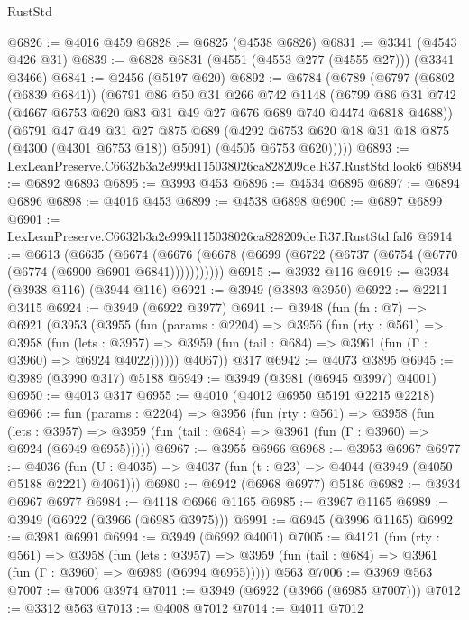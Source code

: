 \begin{lexlean}{RustStd}
\begin{coremodule}
@6826 := @4016 @459
@6828 := @6825 (@4538 @6826)
@6831 := @3341 (@4543 @426 @31)
@6839 := @6828 @6831 (@4551 (@4553 @277 (@4555 @27))) (@3341 @3466)
@6841 := @2456 (@5197 @620)
@6892 := @6784
    (@6789
      (@6797
        (@6802 (@6839 @6841))
        (@6791
          @86
          @50
          @31
          @266
          @742
          @1148
          (@6799 @86 @31 @742 (@4667 @6753 @620 @83 @31 @49 @27 @676 @689 @740 @4474 @6818 @4688))
          (@6791
            @47
            @49
            @31
            @27
            @875
            @689
            (@4292 @6753 @620 @18 @31 @18 @875 (@4300 (@4301 @6753 @18)) @5091)
            (@4505 @6753 @620)))))
@6893 := LexLeanPreserve.C6632b3a2e999d115038026ca828209de.R37.RustStd.look6
@6894 := @6892 @6893
@6895 := @3993 @453
@6896 := @4534 @6895
@6897 := @6894 @6896
@6898 := @4016 @453
@6899 := @4538 @6898
@6900 := @6897 @6899
@6901 := LexLeanPreserve.C6632b3a2e999d115038026ca828209de.R37.RustStd.fal6
@6914 := @6613
    (@6635
      (@6674 (@6676 (@6678 (@6699 (@6722 (@6737 (@6754 (@6770 (@6774 (@6900 @6901 @6841)))))))))))
@6915 := @3932 @116
@6919 := @3934 (@3938 @116) (@3944 @116)
@6921 := @3949 (@3893 @3950)
@6922 := @2211 @3415
@6924 := @3949 (@6922 @3977)
@6941 := @3948
    (fun (fn : @7) =>
    @6921
      (@3953
        (@3955
          (fun (params : @2204) =>
          @3956
            (fun (rty : @561) =>
            @3958
              (fun (lets : @3957) =>
              @3959 (fun (tail : @684) => @3961 (fun (Γ : @3960) => @6924 @4022))))))
        @4067))
    @317
@6942 := @4073 @3895
@6945 := @3989 (@3990 @317) @5188
@6949 := @3949 (@3981 (@6945 @3997) @4001)
@6950 := @4013 @317
@6955 := @4010 (@4012 @6950 @5191 @2215 @2218)
@6966 := fun (params : @2204) =>
  @3956
    (fun (rty : @561) =>
    @3958
      (fun (lets : @3957) =>
      @3959 (fun (tail : @684) => @3961 (fun (Γ : @3960) => @6924 (@6949 @6955)))))
@6967 := @3955 @6966
@6968 := @3953 @6967
@6977 := @4036 (fun (U : @4035) => @4037 (fun (t : @23) => @4044 (@3949 (@4050 @5188 @2221) @4061)))
@6980 := @6942 (@6968 @6977) @5186
@6982 := @3934 @6967 @6977
@6984 := @4118 @6966 @1165
@6985 := @3967 @1165
@6989 := @3949 (@6922 (@3966 (@6985 @3975)))
@6991 := @6945 (@3996 @1165)
@6992 := @3981 @6991
@6994 := @3949 (@6992 @4001)
@7005 := @4121
    (fun (rty : @561) =>
    @3958
      (fun (lets : @3957) =>
      @3959 (fun (tail : @684) => @3961 (fun (Γ : @3960) => @6989 (@6994 @6955)))))
    @563
@7006 := @3969 @563
@7007 := @7006 @3974
@7011 := @3949 (@6922 (@3966 (@6985 @7007)))
@7012 := @3312 @563
@7013 := @4008 @7012
@7014 := @4011 @7012

\end{coremodule}
\end{lexlean}
